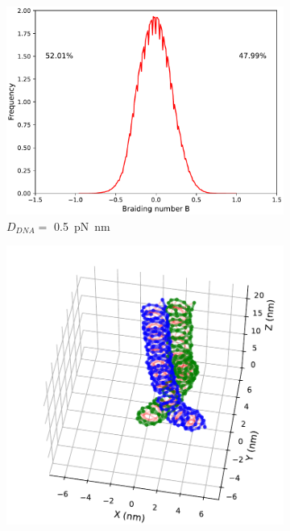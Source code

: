 \documentclass[a4paper,10pt]{article}
\begin{document}
\begin{figure}[tb]
\begin{subfigure}{.3\textwidth}
\includegraphics[width=\textwidth]{brD_5_br_pr.pdf}
\caption{$D_{DNA}=$ \SI{0.5}{\pico\newton\nano\meter}}
\label{fig:braD_a}
\end{subfigure}
\begin{subfigure}{.3\textwidth}
\includegraphics[width=\textwidth]{brD_100_2000000.pdf}

\end{subfigure}
\end{figure}
\end{document}

